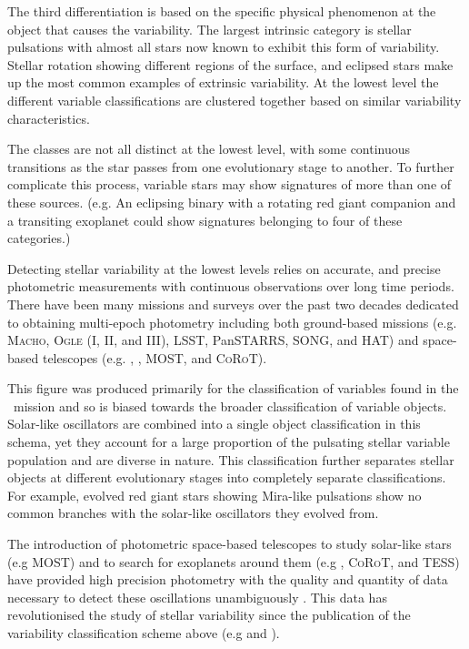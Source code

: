 The third differentiation is based on the specific physical phenomenon at the object that causes the variability. The largest intrinsic category is stellar pulsations with almost all stars now known to exhibit this form of variability. Stellar rotation showing different regions of the surface, and eclipsed stars make up the most common examples of extrinsic variability. At the lowest level the different variable classifications are clustered together based on similar variability characteristics.

The classes are not all distinct at the lowest level, with some continuous transitions as the star passes from one evolutionary stage to another. To further complicate this process, variable stars may show signatures of more than one of these sources. (e.g. An eclipsing binary with a rotating red giant companion and a transiting exoplanet could show signatures belonging to four of these categories.) 

Detecting stellar variability at the lowest levels relies on accurate, and precise photometric measurements with continuous observations over long time periods.
There have been many missions and surveys over the past two decades dedicated to obtaining multi-epoch photometry including both ground-based missions (e.g. \textsc{Macho}, \textsc{Ogle} (I, II, and III), LSST, PanSTARRS, SONG, and HAT) and space-based telescopes (e.g. \Kepler, \Gaia, MOST, and \textsc{CoRoT}).

This figure was produced primarily for the classification of variables found in the \Gaia~mission and so is biased towards the broader classification of variable objects. Solar-like oscillators are combined into a single object classification in this schema, yet they account for a large proportion of the pulsating stellar variable population and are diverse in nature. This classification further separates stellar objects at different evolutionary stages into completely separate classifications. For example, evolved red giant stars showing Mira-like pulsations show no common branches with the solar-like oscillators they evolved from.

The introduction of photometric space-based telescopes to study solar-like stars (e.g MOST) and to search for exoplanets around them (e.g \Kepler, \textsc{CoRoT}, and TESS) have provided high precision photometry with the quality and quantity of data necessary to detect these oscillations unambiguously \citep{stello_detection_2010}. This data has revolutionised the study of stellar variability since the publication of the variability classification scheme above (e.g \citet{chaplin_asteroseismic_2010}  and \citet{basu_determination_2010}). 

